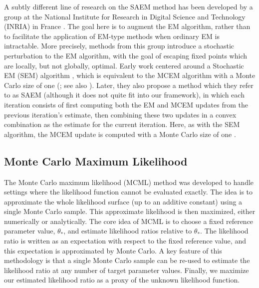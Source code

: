 \documentclass[11pt, oneside]{article}   	%
\begin{document}
A subtly different line of research on the SAEM method has been developed by a group at the National Institute for Research in Digital Science and Technology (INRIA) in France \citep[see, e.g.,][for a discussion of some of their methods]{Cel95}. The goal here is to augment the EM algorithm, rather than to facilitate the application of EM-type methods when ordinary EM is intractable. More precisely, methods from this group introduce a stochastic perturbation to the EM algorithm, with the goal of escaping fixed points which are locally, but not globally, optimal. Early work centered around a Stochastic EM (SEM) algorithm \citep{Cel85}, which is equivalent to the MCEM algorithm with a Monte Carlo size of one (\citealp{Cel87,Cel95}; see also \citealp{Nie00II}). Later, they also propose a method which they refer to as SAEM (although it does not quite fit into our framework), in which each iteration consists of first computing both the EM and MCEM updates from the previous iteration's estimate, then combining these two updates in a convex combination as the estimate for the current iteration. Here, as with the SEM algorithm, the MCEM update is computed with a Monte Carlo size of one \citep{Cel92, Cel95}.

\subsection{Monte Carlo Maximum Likelihood}
\label{sec2:MCML}

The Monte Carlo maximum likelihood (MCML) method was developed to handle settings where the likelihood function cannot be evaluated exactly. The idea is to approximate the whole likelihood surface (up to an additive constant) using a single Monte Carlo sample. This approximate likelihood is then maximized, either numerically or analytically. The core idea of MCML is to choose a fixed reference parameter value, $\theta_*$, and estimate likelihood ratios relative to $\theta_*$. The likelihood ratio is written as an expectation with respect to the fixed reference value, and this expectation is approximated by Monte Carlo. A key feature of this methodology is that a single Monte Carlo sample can be re-used to estimate the likelihood ratio at any number of target parameter values. Finally, we maximize our estimated likelihood ratio as a proxy of the unknown likelihood function.
\end{document}

